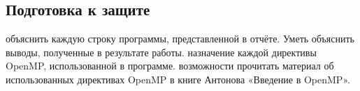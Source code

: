 { %
	\subsection{Подготовка к защите}
	\Large
	\begin{enumerate}
		 объяснить каждую строку программы, представленной в отчёте. Уметь объяснить выводы, полученные в результате работы.
		 назначение каждой директивы OpenMP, использованной в программе.
		 возможности прочитать материал об использованных директивах OpenMP в книге Антонова «Введение в OpenMP».
	\end{enumerate}
}